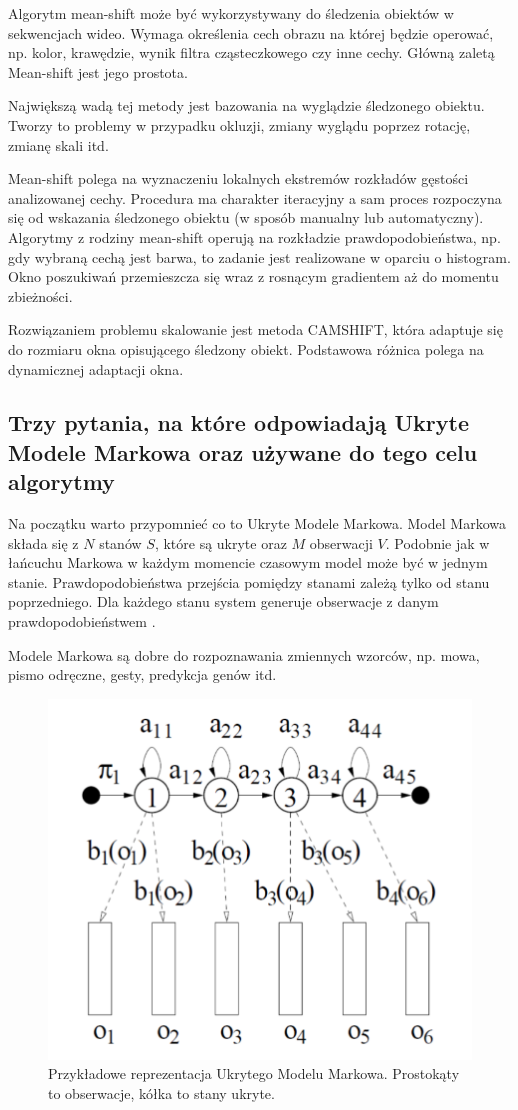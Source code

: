 \documentclass[wi]{zut}
\begin{document}
Algorytm mean-shift może być wykorzystywany do śledzenia obiektów w sekwencjach wideo. Wymaga określenia cech obrazu na której będzie operować, np. kolor, krawędzie, wynik filtra cząsteczkowego czy inne cechy. Główną zaletą Mean-shift jest jego prostota.

Największą wadą tej metody jest bazowania na wyglądzie śledzonego obiektu. Tworzy to problemy w przypadku okluzji, zmiany wyglądu poprzez rotację, zmianę skali itd.

Mean-shift polega na wyznaczeniu lokalnych ekstremów rozkładów gęstości analizowanej cechy. Procedura ma charakter iteracyjny a sam proces rozpoczyna się od wskazania śledzonego obiektu (w sposób manualny lub automatyczny). Algorytmy z rodziny mean-shift operują na rozkładzie prawdopodobieństwa, np. gdy wybraną cechą jest barwa, to zadanie jest realizowane w oparciu o histogram. Okno poszukiwań przemieszcza się wraz z rosnącym gradientem aż do momentu zbieżności.

Rozwiązaniem problemu skalowanie jest metoda CAMSHIFT, która adaptuje się do rozmiaru okna opisującego śledzony obiekt. Podstawowa różnica polega na dynamicznej adaptacji okna. 

\subsection{Trzy pytania, na które odpowiadają Ukryte Modele Markowa oraz używane do tego celu algorytmy}

Na początku warto przypomnieć co to Ukryte Modele Markowa. Model Markowa składa się z $N$ stanów $S$, które są ukryte oraz $M$ obserwacji $V$. Podobnie jak w łańcuchu Markowa w każdym momencie czasowym model może być w jednym stanie. Prawdopodobieństwa przejścia pomiędzy stanami zależą tylko od stanu poprzedniego. Dla każdego stanu system generuje obserwacje z danym prawdopodobieństwem \cite{Pietrzykowski2020}. 

Modele Markowa są dobre do rozpoznawania zmiennych wzorców, np. mowa, pismo odręczne, gesty, predykcja genów itd.\cite{Pietrzykowski2020}

\begin{figure}[H]
    \centering
    \includegraphics[width=0.5\linewidth]{images/hidden_markov.png}
    \caption{Przykładowe reprezentacja Ukrytego Modelu Markowa. Prostokąty to obserwacje, kółka to stany ukryte.}
    \label{fig:pdgd}
\end{figure}
\end{document}
